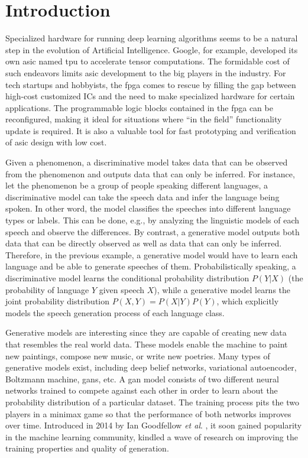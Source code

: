 
\chapter{Introduction}

Specialized hardware for running deep learning algorithms seems to be a natural step in the evolution of
Artificial Intelligence.  Google, for example, developed its own \gls{asic} named \gls{tpu}
to accelerate tensor computations. The formidable cost of such endeavors limits \gls{asic} development to
the big players in the industry. For tech startups and hobbyists, the \gls{fpga} comes to rescue by filling
the gap between high-cost customized ICs and the need to make specialized hardware for certain
applications. The programmable logic blocks contained in the \gls{fpga} can be reconfigured, making it
ideal for situations where "`in the field"' functionality update is required. It is also a valuable tool
for fast prototyping and verification of \gls{asic} design with low cost.

Given a phenomenon, a discriminative model takes data that can be observed from the phenomenon and outputs
data that can only be inferred. For instance, let the phenomenon be a group of people speaking different
languages, a discriminative model can take the speech data and infer the language being spoken. In other
word, the model classifies the speeches into different language types or labels. This can be done, e.g.,
by analyzing the linguistic models of each speech and observe the differences. By contrast, a generative
model outputs both data that can be directly observed as well as data that can only be inferred. Therefore,
in the previous example, a generative model would have to learn each language and be able to generate
speeches of them. Probabilistically speaking, a discriminative model learns the conditional probability
distribution $P(Y \vert X)$ (the probability of language $Y$ given speech $X$), while a generative model
learns the joint probability distribution $P(X,Y) = P(X \vert Y)P(Y)$, which explicitly models the speech
generation process of each language class.

Generative models are interesting since they are capable of creating new data that resembles the real world
data. These models enable the machine to paint new paintings, compose new music, or write new poetries.
Many types of generative models exist, including deep belief networks, variational autoencoder,
Boltzmann machine, \gls{gan}s, etc. A \gls{gan} model consists of two different neural networks trained to
compete against each other in order to learn about the probability distribution of a particular dataset.
The training process pits the two players in a minimax game so that the performance of both networks improves
over time. Introduced in 2014 by Ian Goodfellow \textit{et al}. \cite{goodfellow:gan}, it soon gained
popularity in the machine learning community, kindled a wave of research on improving the training properties
and quality of generation.

